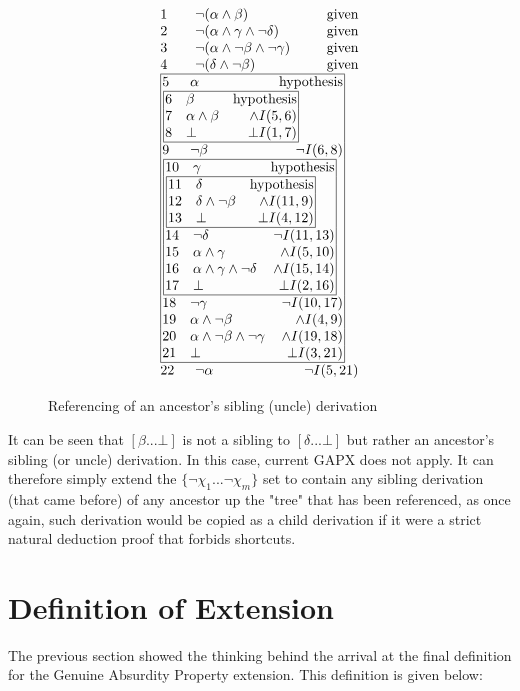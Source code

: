 \documentclass[11pt,twoside,a4paper]{report}
\begin{document}
\begin{figure}[thp]
\[\vbox{\offinterlineskip\halign{
&\tabskip=1.5em#\strut&$#$\hfil\tabskip=1em&\hfil$#$\tabskip=0em\cr
%
1&\neg(\alpha\wedge\beta)&\mbox{given}\cr
2&\neg(\alpha\wedge\gamma\wedge\neg\delta)&\mbox{given}\cr
3&\neg(\alpha\wedge\neg\beta\wedge\neg\gamma)&\mbox{given}\cr
4&\neg(\delta\wedge\neg\beta)&\mbox{given}\cr
%
\multispan3\vbox{\halign{
\vrule#&&\hskip.1em\tabskip=1em#\strut&$#$\hfil\tabskip=1em&\hfil$#$\hskip0.1em\tabskip=0em&\vrule#\cr
\noalign{\hrule}
%
&5&\alpha&\mbox{hypothesis}&\cr
%
&\multispan3\,\vbox{\halign{
\vrule#&&\hskip.1em\tabskip=1em#\strut&$#$\hfil\tabskip=1em&\hfil$#$\hskip0.1em\tabskip=0em&\vrule#\cr
\noalign{\hrule}
%
&6&\beta&\mbox{hypothesis}&\cr
&7&\alpha\wedge\beta&\wedge I(5,6)&\cr
&8&\bot&\bot I(1,7)&\cr
%
\noalign{\hrule}}}\,&\cr
%
&9&\neg\beta&\neg I(6,8)&\cr
%
&\multispan3\,\vbox{\halign{
\vrule#&&\hskip.1em\tabskip=1em#\strut&$#$\hfil\tabskip=1em&\hfil$#$\hskip0.1em\tabskip=0em&\vrule#\cr
\noalign{\hrule}
%
&10&\gamma&\mbox{hypothesis}&\cr
%
&\multispan3\,\vbox{\halign{
\vrule#&&\hskip.1em\tabskip=1em#\strut&$#$\hfil\tabskip=1em&\hfil$#$\hskip0.1em\tabskip=0em&\vrule#\cr
\noalign{\hrule}
%
&11&\delta&\mbox{hypothesis}&\cr
&12&\delta\wedge\neg\beta&\wedge I(11,9)&\cr
&13&\bot&\bot I(4,12)&\cr
%
\noalign{\hrule}}}\,&\cr
%
&14&\neg\delta&\neg I(11,13)&\cr
&15&\alpha\wedge\gamma&\wedge I(5,10)&\cr
&16&\alpha\wedge\gamma\wedge\neg\delta&\wedge I(15,14)&\cr
&17&\bot&\bot I(2,16)&\cr
%
\noalign{\hrule}}}\,&\cr
%
&18&\neg\gamma&\neg I(10,17)&\cr
&19&\alpha\wedge\neg\beta&\wedge I(4,9)&\cr
&20&\alpha\wedge\neg\beta\wedge\neg\gamma&\wedge I(19,18)&\cr
&21&\bot&\bot I(3,21)&\cr
%
\noalign{\hrule}}}\,\cr
%
22&\neg\alpha&\neg I(5,21)\cr
}}\]
\caption{Referencing of an ancestor's sibling (uncle) derivation\label{fig:gapxx}}
\end{figure}

It can be seen that $[\beta ... \bot]$ is not a sibling to $[\delta ... \bot]$ but rather an ancestor's sibling (or uncle) derivation. In this case, current GAPX does not apply. It can therefore simply extend the $\{\neg\chi_1 ... \neg\chi_m\}$ set to contain any sibling derivation (that came before) of any ancestor up the "tree" that has been referenced, as once again, such derivation would be copied as a child derivation if it were a strict natural deduction proof that forbids shortcuts.

\section{Definition of Extension}
The previous section showed the thinking behind the arrival at the final definition for the Genuine Absurdity Property extension. This definition is given below:
\end{document}
